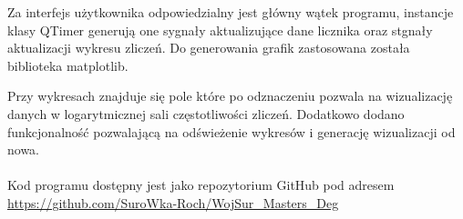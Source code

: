 Za interfejs użytkownika odpowiedzialny jest główny wątek programu, instancje klasy QTimer\cite{doc pyqt} generują one sygnały aktualizujące dane licznika oraz stgnały aktualizacji wykresu zliczeń. 
Do generowania grafik zastosowana została biblioteka matplotlib\cite{doc matplotlib}. 

Przy wykresach znajduje się pole które po odznaczeniu pozwala na wizualizację danych w logarytmicznej sali częstotliwości zliczeń. Dodatkowo dodano funkcjonalność pozwalającą na odświeżenie wykresów i generację wizualizacji od nowa.

\paragraph*{}

Kod programu dostępny jest jako repozytorium GitHub pod adresem \url{https://github.com/SuroWka-Roch/WojSur_Masters_Deg}

